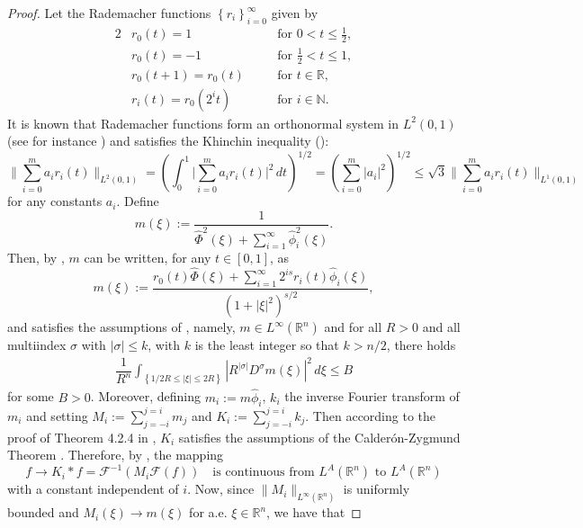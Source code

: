 \documentclass[leqno,twoside, 12pt]{amsart}
\theoremstyle{plain}
\numberwithin{equation}{section} \numberwithin{figure}{section}
\theoremstyle{definition}
\newcommand{\R}{\mathbb R}
\numberwithin{equation}{section}
\begin{document}
\begin{proof}
Let the Rademacher functions $\left\lbrace r_i \right\rbrace_{i=0}^\infty$ given by
\begin{alignat*}{2}
&r_0(t)   = 1          & \quad & \text{for } 0 < t \leq \frac{1}{2}, \\
&r_0(t)   = -1         & \quad & \text{for } \frac{1}{2} < t \leq 1, \\
&r_0(t+1) = r_0(t)     & \quad & \text{for } t \in \mathbb{R} ,      \\
&r_i(t)   = r_0(2^i t) & \quad & \text{for } i \in \mathbb{N}.
\end{alignat*}
It is known that Rademacher functions form an orthonormal system in $L^2(0, 1)$ (see for instance \cite{AH}) and satisfies the Khinchin inequality (\cite[Lemma 4.2.3]{AH}):
\begin{equation}\label{K ineq}
\bigg\|\sum_{i=0}^ma_ir_i(t)\bigg\|_{L^2(0,1)}=\left(\int_0^1\bigg|\sum_{i=0}^ma_ir_i(t) \bigg|^2\,dt\right)^{1/2}= \left(\sum_{i=0}^m|a_i|^2\right)^{1/2}\leq \sqrt{3}\bigg\|\sum_{i=0}^ma_ir_i(t)\bigg\|_{L^1(0,1)}
\end{equation}for any constants $a_i$. Define
$$m(\xi):=\dfrac{1}{\hat \Phi^2(\xi) + \sum_{i=1}^\infty\hat \phi_i^2(\xi)}.$$Then, by \cite[Lemma 4.2.5]{AH}, $m$ can be written, for any $t\in [0, 1]$, as
$$m(\xi):=\dfrac{r_0(t)\hat \Phi(\xi)+\sum_{i=1}^\infty 2^{is}r_i(t)\hat \phi_i(\xi)}{(1+|\xi|^2)^{s/2}},$$
and satisfies the assumptions of \cite[Theorem 4.2.4]{AH}, namely, $m\in L^{\infty}(\R^n)$ and for all $R>0$ and all multiindex $\sigma$ with $|\sigma|\leq k$, with $k$ is the least integer so that $k>n/2$, there holds
\begin{equation*}
\begin{split}
\dfrac{1}{R^n}\int_{\left\lbrace 1/2  R\leq |\xi|\leq 2R \right\rbrace }|R^{|\sigma|}D^\sigma m(\xi)|^2\,d\xi \leq B
\end{split}
\end{equation*}for some $B>0$. Moreover, defining $m_i:=m\hat \phi_i$, $k_i$ the inverse Fourier transform of $m_i$ and setting $M_i:=\sum_{j=-i}^{j=i}m_j$ and $K_i:=\sum_{j=-i}^{j=i}k_j$. Then according to the proof of Theorem 4.2.4 in \cite{AH}, $K_i$ satisfies the assumptions of the Calder\'on-Zygmund Theorem \cite[Theorem 5.1 and Theorem 7.11]{D}. Therefore, by \cite[Corollary 5.4.3]{HH}, the mapping
$$f\to K_i*f=\mathcal{F}^{-1}(M_i\mathcal{F}(f)) \quad \text{is continuous from }L^A(\R^n) \text{ to }L^A(\R^n)$$with a constant independent of $i$. Now, since $\|M_i\|_{L^\infty(\R^n)}$ is uniformly bounded and $M_i(\xi)\to m(\xi)$ for a.e. $\xi \in \R^n$, we have that

\end{proof}
\end{document}
